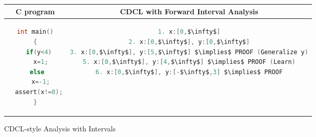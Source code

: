 {\begin{figure}[t]
\centering
\begin{tabular}{c|c}
\hline
C program & CDCL with Forward Interval Analysis \\
\hline
\scriptsize
\begin{lstlisting}[mathescape=true,language=C]
int main()
{
  if(y<4)
   x=1;
  else 
   x=-1;
  assert(x!=0);
}
\end{lstlisting}
&
\begin{lstlisting}[mathescape=true,language=C]
1. x:[0,$\infty$]
2. x:[0,$\infty$], y:[0,$\infty$]
3. x:[0,$\infty$], y:[5,$\infty$] $\implies$ PROOF (Generalize y)
5. x:[0,$\infty$], y:[4,$\infty$] $\implies$ PROOF (Learn)
6. x:[0,$\infty$], y:[-$\infty$,3] $\implies$ PROOF
\end{lstlisting}
\\
\hline
\end{tabular}
\caption{\label{fig:cdcl}
CDCL-style Analysis with Intervals}
\end{figure}
}

